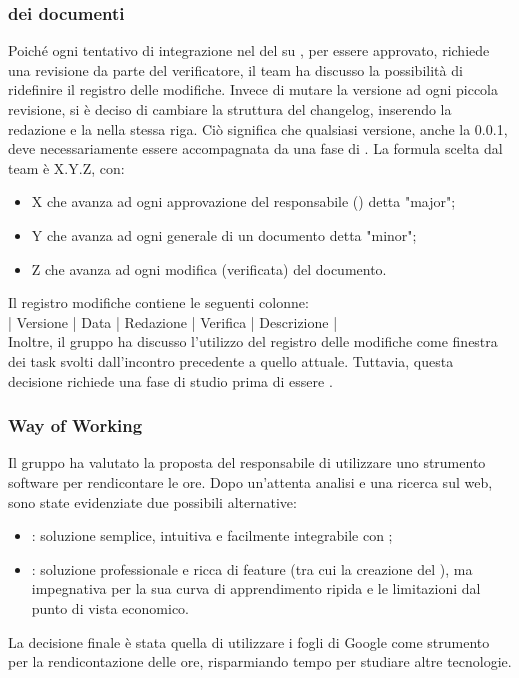\subsubsection{ dei documenti} \label{sec:versionamento}
Poiché ogni tentativo di integrazione nel  del  su , per essere approvato, richiede una revisione da parte del verificatore, il team ha discusso la possibilità di ridefinire il registro delle modifiche. Invece di mutare la versione ad ogni piccola revisione, si è deciso di cambiare la struttura del changelog, inserendo la redazione e la  nella stessa riga. Ciò significa che qualsiasi versione, anche la 0.0.1, deve necessariamente essere accompagnata da una fase di . La formula scelta dal team è X.Y.Z, con:
\begin{itemize}
	\item X che avanza ad ogni approvazione del responsabile () detta "major";
	\item Y che avanza ad ogni  generale di un documento detta "minor";
	\item Z che avanza ad ogni modifica (verificata) del documento.
\end{itemize}

\vspace{0.5\baselineskip}
Il registro modifiche contiene le seguenti colonne: \\
\vspace{\baselineskip}
\hspace{1cm} | Versione | Data | Redazione | Verifica | Descrizione | \\
Inoltre, il gruppo ha discusso l'utilizzo del registro delle modifiche come finestra dei task svolti dall'incontro precedente a quello attuale. Tuttavia, questa decisione richiede una fase di studio prima di essere .

\subsubsection{Way of Working}
Il gruppo ha valutato la proposta del responsabile di utilizzare uno strumento software per rendicontare le ore. Dopo un'attenta analisi e una ricerca sul web, sono state evidenziate due possibili alternative:
\begin{itemize}
	\item {}: soluzione semplice, intuitiva e facilmente integrabile con ;
	\item {}: soluzione professionale e ricca di feature (tra cui la creazione del ), ma impegnativa per la sua curva di apprendimento ripida e le limitazioni dal punto di vista economico.
\end{itemize}
La decisione finale è stata quella di utilizzare i fogli di Google come strumento per la rendicontazione delle ore, risparmiando tempo per studiare altre tecnologie. 


